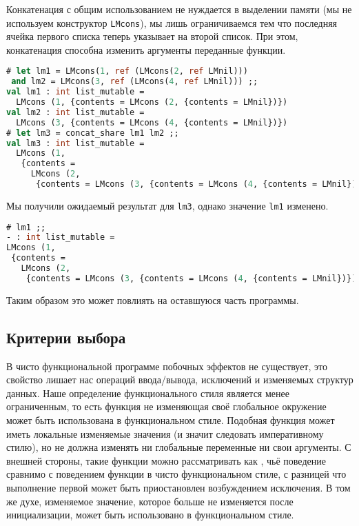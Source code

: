 Конкатенация с общим использованием не нуждается в выделении памяти (мы не
используем конструктор \texttt{LMcons}), мы лишь ограничиваемся тем что
последняя ячейка первого списка теперь указывает на второй список. При этом,
конкатенация способна изменить аргументы переданные функции.

\begin{lstlisting}[language=OCaml]
# let lm1 = LMcons(1, ref (LMcons(2, ref LMnil)))
 and lm2 = LMcons(3, ref (LMcons(4, ref LMnil))) ;;
val lm1 : int list_mutable =
  LMcons (1, {contents = LMcons (2, {contents = LMnil})})
val lm2 : int list_mutable =
  LMcons (3, {contents = LMcons (4, {contents = LMnil})})
# let lm3 = concat_share lm1 lm2 ;;
val lm3 : int list_mutable =
  LMcons (1,
   {contents =
     LMcons (2,
      {contents = LMcons (3, {contents = LMcons (4, {contents = LMnil})})})})
\end{lstlisting}

Мы получили ожидаемый результат для \texttt{lm3}, однако значение \texttt{lm1}
изменено.

\begin{lstlisting}[language=OCaml]
# lm1 ;;
- : int list_mutable =
LMcons (1,
 {contents =
   LMcons (2,
    {contents = LMcons (3, {contents = LMcons (4, {contents = LMnil})})})})
\end{lstlisting}

Таким образом это может повлиять на оставшуюся часть программы.

\subsection{Критерии выбора}
\label{subsec:how_to_choose_your_style}

В чисто функциональной программе побочных эффектов не существует, это свойство
лишает нас операций ввода/вывода, исключений и изменяемых структур данных. Наше
определение функционального стиля является менее ограниченным, то есть функция
не изменяющая своё глобальное окружение может быть использована в функциональном
стиле. Подобная функция может иметь локальные изменяемые значения (и значит
следовать императивному стилю), но не должна изменять ни глобальные переменные
ни свои аргументы. С внешней стороны, такие функции можно рассматривать как
, чьё поведение сравнимо с поведением функции в чисто
функциональном стиле, с разницей что выполнение первой может быть приостановлен
возбуждением исключения. В том же духе, изменяемое значение, которое больше не
изменяется после инициализации, может быть использовано в функциональном стиле.

